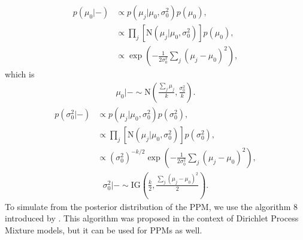 \documentclass{article}
\begin{document}
\begin{align}
    p(\mu_{0}| - ) & \propto p(\mu_{j}| \mu_{0},\sigma^{2}_{0}) p(\mu_{0}), \nonumber \\
    & \propto  \prod_{j} \left[ \mbox{N}(\mu_{j}| \mu_{0}, \sigma^{2}_{0}) \right] p(\mu_{0}), \nonumber \\
    & \propto \exp \left( - \frac{1}{2 \sigma^{2}_{0}} \sum_{j} (\mu_{j} - \mu_{0})^{2}  \right), \nonumber
\end{align}
which is
\begin{align}
    \mu_{0}|- \sim \mbox{N}\left( \frac{\sum_{j} \mu_{j}}{k}, \frac{\sigma^{2}_{0}}{k} \right).
\end{align}
\begin{align}
    p(\sigma^{2}_{0}| - ) & \propto p(\mu_{j}| \mu_{0}, \sigma^{2}_{0}) p(\sigma^{2}_{0}), \nonumber \\
    & \propto  \prod_{j} \left[ \mbox{N}(\mu_{j}| \mu_{0}, \sigma^{2}_{0}) \right] p(\sigma^{2}_{0}), \nonumber \\
    & \propto (\sigma^{2}_{0})^{-k/2} \exp \left( - \frac{1}{2 \sigma^{2}_{0}} \sum_{j} (\mu_{j} - \mu_{0})^{2}  \right), \nonumber
\end{align}
\begin{align}
    \sigma^{2}_{0}|- \sim \mbox{IG}\left( \frac{k}{2}, \frac{\sum_{j} (\mu_{j} - \mu_{0})^{2}}{2} \right).
\end{align}
To simulate from the posterior distribution of the PPM, we use the algorithm 8 introduced by \textcite{neal2000markov}. This algorithm was proposed in the context of Dirichlet Process Mixture models, but it can be used for PPMs as well.
\end{document}
